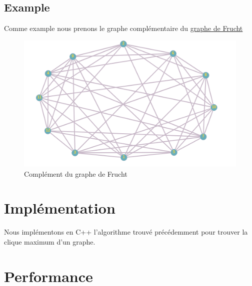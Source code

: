 \documentclass{article}
\begin{document}
\subsection{Example}
Comme example nous prenons le graphe complémentaire du \href{https://en.wikipedia.org/wiki/Frucht\_graph}{graphe de Frucht}
\begin{center}
  \begin{figure}[!htp]
    \caption{Complément du graphe de Frucht}
    \includegraphics[scale=0.7]{frucht-compl.png}
  \end{figure}
\end{center}

\section{Implémentation}
Nous implémentons en C++ l'algorithme trouvé précédemment pour trouver la clique
maximum d'un graphe.

\section{Performance}
\end{document}
